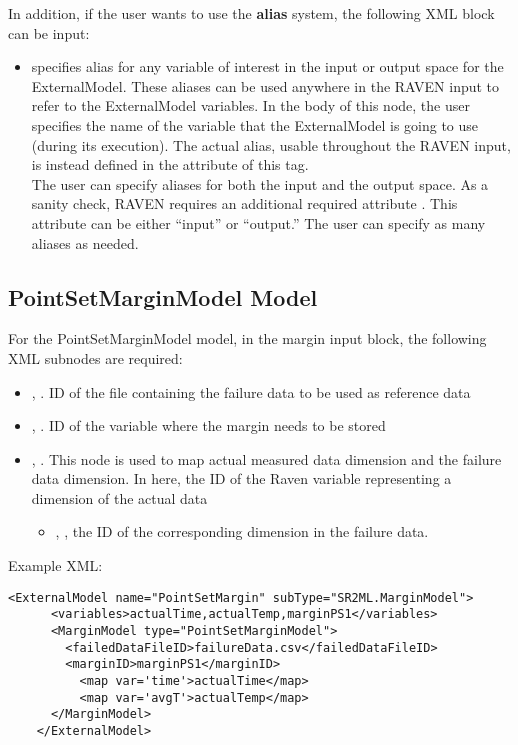In addition, if the user wants to use the \textbf{alias} system, the following XML block can be input:
\begin{itemize}
	\item {}  specifies alias for
	any variable of interest in the input or output space for the ExternalModel.
	These aliases can be used anywhere in the RAVEN input to refer to the ExternalModel
	variables.
	In the body of this node, the user specifies the name of the variable that the ExternalModel is
	going to use (during its execution).
	The actual alias, usable throughout the RAVEN input, is instead defined in the
	 attribute of this tag.
	\\The user can specify aliases for both the input and the output space. As a sanity check, RAVEN
	requires an additional required attribute . This attribute can be either ``input'' or ``output.''
	\nb The user can specify as many aliases as needed.
\end{itemize}

\subsection{PointSetMarginModel Model}
For the PointSetMarginModel model, in the margin  input block, the following XML subnodes 
are required:
\begin{itemize}
	\item {}, . ID of the file containing the failure data
	      to be used as reference data
	\item {}, . ID of the variable where the margin needs to be stored
	\item {}, . This node is used to map actual measured data dimension and the 
	      failure data dimension. In here, the ID of the Raven variable representing a dimension of the actual data
	\begin{itemize}
		\item {}, , the ID of the corresponding dimension in the failure data.
	\end{itemize}
\end{itemize}

Example XML:
\begin{lstlisting}[style=XML]
    <ExternalModel name="PointSetMargin" subType="SR2ML.MarginModel">
      <variables>actualTime,actualTemp,marginPS1</variables>
      <MarginModel type="PointSetMarginModel">
        <failedDataFileID>failureData.csv</failedDataFileID>
        <marginID>marginPS1</marginID>
	      <map var='time'>actualTime</map>
	      <map var='avgT'>actualTemp</map>
      </MarginModel>
    </ExternalModel>
\end{lstlisting}